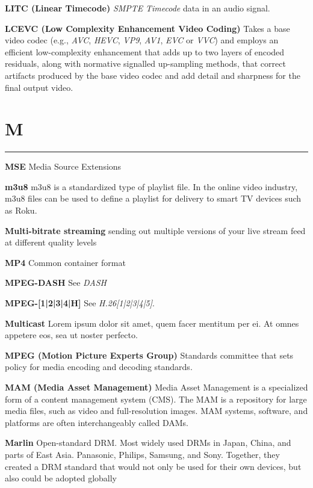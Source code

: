 \smallskip
\textbf{LITC (Linear Timecode)}
\textit{SMPTE} \textit{Timecode} data in an audio signal.

\smallskip
\textbf{LCEVC (Low Complexity Enhancement Video Coding)}
Takes a base video codec (e.g., \textit{AVC}, \textit{HEVC}, \textit{VP9}, \textit{AV1}, \textit{EVC} or \textit{VVC}) and employs an efficient low-complexity enhancement that adds up to two layers of encoded residuals, along with normative signalled up-sampling methods, that correct artifacts produced by the base video codec and add detail and sharpness for the final output video.


\section{M}
\hrule

\medskip
\textbf{MSE}
Media Source Extensions

\smallskip
\textbf{m3u8}
m3u8 is a standardized type of playlist file. In the online video industry, m3u8 files can be used to define a playlist for delivery to smart TV devices such as Roku.

\smallskip
\textbf{Multi-bitrate streaming}
sending out multiple versions of your live stream feed at different quality levels

\smallskip
\textbf{MP4}
Common container format

\smallskip
\textbf{MPEG-DASH}
See \textit{DASH}

\smallskip
\textbf{MPEG-[1|2|3|4|H]}
See \textit{H.26[1|2|3|4|5]}.

\smallskip
\textbf{Multicast}
Lorem ipsum dolor sit amet, quem facer mentitum per ei. At omnes appetere eos, sea ut noster perfecto.

\smallskip
\textbf{MPEG (Motion Picture Experts Group)}
Standards committee that sets policy for media encoding and decoding standards.

\smallskip
\textbf{MAM (Media Asset Management)}
Media Asset Management is a specialized form of a content management system (CMS). The MAM is a repository for large media files, such as video and full-resolution images. MAM systems, software, and platforms are often interchangeably called DAMs.

\smallskip
\textbf{Marlin}
Open-standard DRM. Most widely used DRMs in Japan, China, and parts of East Asia. Panasonic, Philips, Samsung, and Sony. Together, they created a DRM standard that would not only be used for their own devices, but also could be adopted globally

